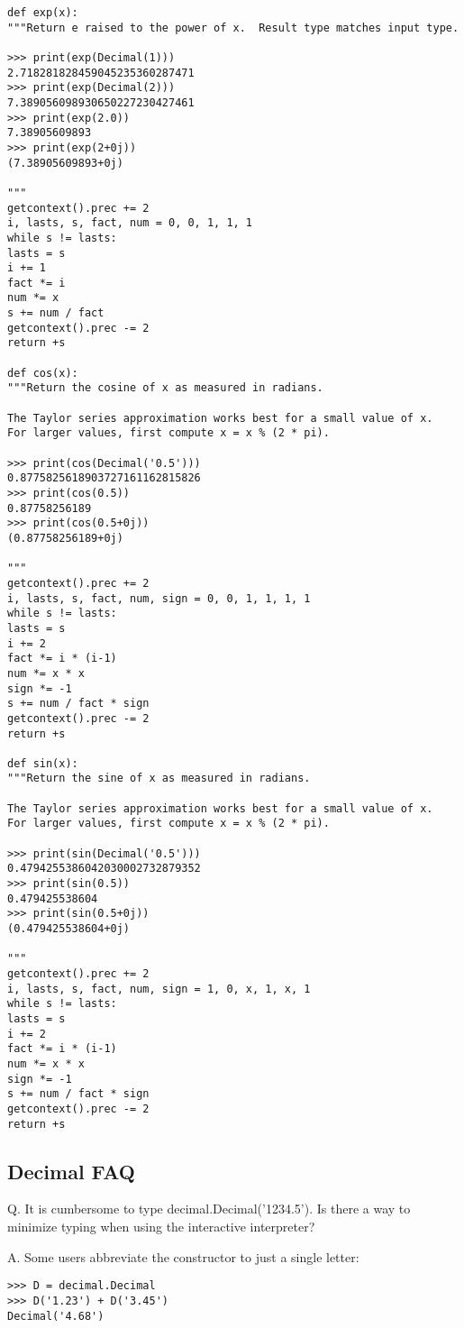 \begin{lstlisting}
def exp(x):
"""Return e raised to the power of x.  Result type matches input type.

>>> print(exp(Decimal(1)))
2.718281828459045235360287471
>>> print(exp(Decimal(2)))
7.389056098930650227230427461
>>> print(exp(2.0))
7.38905609893
>>> print(exp(2+0j))
(7.38905609893+0j)

"""
getcontext().prec += 2
i, lasts, s, fact, num = 0, 0, 1, 1, 1
while s != lasts:
lasts = s
i += 1
fact *= i
num *= x
s += num / fact
getcontext().prec -= 2
return +s

def cos(x):
"""Return the cosine of x as measured in radians.

The Taylor series approximation works best for a small value of x.
For larger values, first compute x = x % (2 * pi).

>>> print(cos(Decimal('0.5')))
0.8775825618903727161162815826
>>> print(cos(0.5))
0.87758256189
>>> print(cos(0.5+0j))
(0.87758256189+0j)

"""
getcontext().prec += 2
i, lasts, s, fact, num, sign = 0, 0, 1, 1, 1, 1
while s != lasts:
lasts = s
i += 2
fact *= i * (i-1)
num *= x * x
sign *= -1
s += num / fact * sign
getcontext().prec -= 2
return +s

def sin(x):
"""Return the sine of x as measured in radians.

The Taylor series approximation works best for a small value of x.
For larger values, first compute x = x % (2 * pi).

>>> print(sin(Decimal('0.5')))
0.4794255386042030002732879352
>>> print(sin(0.5))
0.479425538604
>>> print(sin(0.5+0j))
(0.479425538604+0j)

"""
getcontext().prec += 2
i, lasts, s, fact, num, sign = 1, 0, x, 1, x, 1
while s != lasts:
lasts = s
i += 2
fact *= i * (i-1)
num *= x * x
sign *= -1
s += num / fact * sign
getcontext().prec -= 2
return +s
\end{lstlisting}

\subsection{ Decimal FAQ}

Q. It is cumbersome to type decimal.Decimal('1234.5'). Is there a way to minimize typing when using the interactive interpreter?

A. Some users abbreviate the constructor to just a single letter:

\begin{lstlisting}
>>> D = decimal.Decimal
>>> D('1.23') + D('3.45')
Decimal('4.68')
\end{lstlisting}

